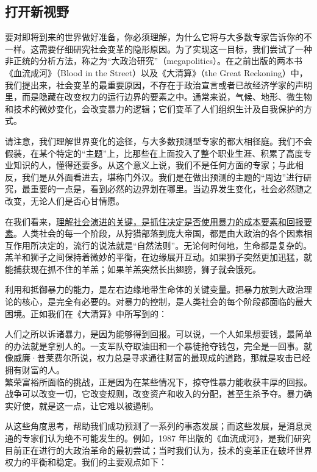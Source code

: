 \subsection{打开新视野}

要对即将到来的世界做好准备，你必须理解，为什么它将与大多数专家告诉你的不一样。这需要仔细研究社会变革的隐形原因。为了实现这一目标，我们尝试了一种非正统的分析方法，称之为“大政治研究”（megapolitics）。在之前出版的两本书《血流成河》（Blood in the Street）以及《大清算》（the Great Reckoning）中，我们提出来，社会变革的最重要原因，不存在于政治宣言或者已故经济学家的声明里，而是隐藏在改变权力的运行边界的要素之中。通常来说，气候、地形、微生物和技术的微妙变化，会改变暴力的逻辑；它们变革了人们组织生计及自我保护的方式。


请注意，我们理解世界变化的途径，与大多数预测型专家的都大相径庭。我们不会假装，在某个特定的“主题”上，比那些在上面投入了整个职业生涯、积累了高度专业知识的人，懂得还要多。从这个意义上说，我们不是任何方面的专家；与此相反，我们是从外面看进去，堪称门外汉。我们是在做出预测的主题的“周边”进行研究，最重要的一点是，看到必然的边界划在哪里。当边界发生变化，社会必然随之改变，无论人们是否心甘情愿。


在我们看来，\uline{理解社会演进的关键，是抓住决定是否使用暴力的成本要素和回报要素}。人类社会的每一个阶段，从狩猎部落到庞大帝国，都是由大政治的各个因素相互作用所决定的，流行的说法就是“自然法则”。无论何时何地，生命都是复杂的。羔羊和狮子之间保持着微妙的平衡，在边缘展开互动。如果狮子突然更加迅猛，就能捕获现在抓不住的羊羔；如果羊羔突然长出翅膀，狮子就会饿死。

利用和抵御暴力的能力，是左右边缘地带生命体的关键变量。把暴力放到大政治理论的核心，是完全有必要的。对暴力的控制，是人类社会的每个阶段都面临的最大困境。正如我们在《大清算》中所写到的：

\begin{tcolorbox}
\kaishu 人们之所以诉诸暴力，是因为能够得到回报。可以说，一个人如果想要钱，最简单的办法就是拿别人的。一支军队夺取油田和一个暴徒抢夺钱包，完全是一回事。就像威廉·普莱费尔所说，权力总是寻求通往财富的最现成的道路，那就是攻击已经拥有财富的人。\\

繁荣富裕所面临的挑战，正是因为在某些情况下，掠夺性暴力能收获丰厚的回报。战争可以改变一切，它改变规则，改变资产和收入的分配，甚至生杀予夺。暴力确实好使，就是这一点，让它难以被遏制。

\end{tcolorbox}

从这些角度思考，帮助我们成功预测了一系列的事态发展；而这些发展，是消息灵通的专家们认为绝不可能发生的。例如，1987 年出版的《血流成河》，是我们研究目前正在进行的大政治革命的最初尝试；当时我们认为，技术的变革正在破坏世界权力的平衡和稳定。我们的主要观点如下：

